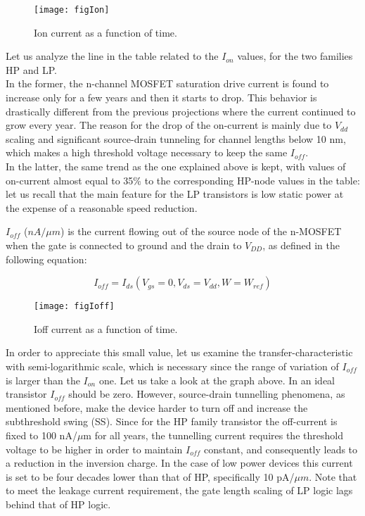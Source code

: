 \documentclass[a4paper, 12pt, twoside, openright]{report}
\begin{document}
	\begin{figure}[h]
	\centering
	\texttt{[image: figIon]}
	\caption{Ion current as a function of time.}
	\label{}
	\end{figure}

Let us analyze the line in the table related to the $I_{on}$ values, for the two families HP and LP. \\In the former, the n-channel MOSFET saturation drive current is found to increase only for a few years and then it starts to drop. This behavior is drastically different from the previous projections where the current continued to grow every year. The reason for the drop of the on-current is mainly due to $V_{dd}$ scaling and significant source-drain tunneling for channel lengths below 10 nm, which makes a high threshold voltage necessary to keep the same $I_{off}$.\\
In the latter, the same trend as the one explained above is kept, with values of on-current almost equal to 35\% to the corresponding HP-node values in the table: let us recall that the main feature for the LP transistors is low static power at the expense of a reasonable speed reduction.

$I_{off}$ ($nA/\mu m$) is the current flowing out of the source node of the n-MOSFET when the gate is connected to ground and the drain to $V_{DD}$, as defined in the following equation:

\begin{equation}
I_{off} = I_{ds}(V_{gs}=0, V_{ds}=V_{dd}, W=W_{ref})
\label{}
\end{equation}

	\begin{figure}[h]
	\centering
	\texttt{[image: figIoff]}
	\caption{Ioff current as a function of time.}
	\label{}
	\end{figure}

In order to appreciate this small value, let us examine the transfer-characteristic with semi-logarithmic scale, which is necessary since the range of variation of $I_{off}$ is larger than the $I_{on}$ one. Let us take a look at the graph above.
In an ideal transistor $I_{off}$ should be zero. However, source-drain tunnelling phenomena, as mentioned before, make the device harder to turn off and increase the subthreshold swing (SS). Since for the HP family transistor the off-current is fixed to 100 nA/$\mu$m for all years, the tunnelling current requires the threshold voltage to be higher in order to maintain $I_{off}$ constant, and consequently leads to a reduction in the inversion charge.
In the case of low power devices this current is set to be four decades lower than that of HP, specifically 10 pA/$\mu m$. Note that to meet the leakage current requirement, the gate length scaling of LP logic lags behind that of HP logic.
\end{document}
